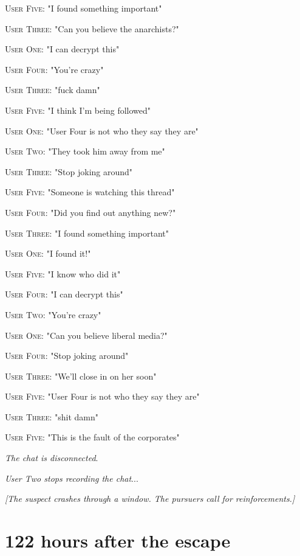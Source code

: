 \documentclass{report}
\begin{document}
\textsc{User Five}: "I found something important" 

\textsc{User Three}: "Can you believe the anarchists?" 

\textsc{User One}: "I can decrypt this" 

\textsc{User Four}: "You're crazy" 

\textsc{User Three}: "fuck damn" 

\textsc{User Five}: "I think I'm being followed" 

\textsc{User One}: "User Four is not who they say they are" 

\textsc{User Two}: "They took him away from me" 

\textsc{User Three}: "Stop joking around" 

\textsc{User Five}: "Someone is watching this thread" 

\textsc{User Four}: "Did you find out anything new?" 

\textsc{User Three}: "I found something important" 

\textsc{User One}: "I found it!" 

\textsc{User Five}: "I know who did it" 

\textsc{User Four}: "I can decrypt this" 

\textsc{User Two}: "You're crazy" 

\textsc{User One}: "Can you believe liberal media?" 

\textsc{User Four}: "Stop joking around" 

\textsc{User Three}: "We'll close in on her soon" 

\textsc{User Five}: "User Four is not who they say they are" 

\textsc{User Three}: "shit damn" 

\textsc{User Five}: "This is the fault of the corporates" 

\textit{The chat is disconnected}. 

\textit{User Two stops recording the chat}...

\textit{[The suspect crashes through a window. The pursuers call for reinforcements.]}


\section*{122 \small{hours after the escape}}
\end{document}
